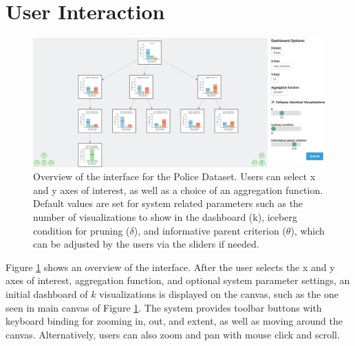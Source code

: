 \section{User Interaction\label{sec:interaction}}
\begin{figure}[ht!]
\centering
\includegraphics[width=\linewidth]{figures/overview.jpeg}
\caption{Overview of the \system interface for the Police Dataset. Users can select x and y axes of interest, as well as a choice of an aggregation function. Default values are set for system related parameters such as the number of visualizations to show in the dashboard (k), iceberg condition for pruning ($\delta$), and informative parent criterion ($\theta$), which can be adjusted by the users via the sliders if needed.}
\label{fig:overview}
\end{figure}
\par Figure \ref{fig:overview} shows an overview of the \system interface. After the user selects the x and y axes of interest, aggregation function, and optional system parameter settings, an initial dashboard of $k$ visualizations is displayed on the canvas, such as the one seen in main canvas of Figure \ref{fig:overview}. The system provides toolbar buttons with keyboard binding for zooming in, out, and extent, as well as moving around the canvas. Alternatively, users can also zoom and pan with mouse click and scroll.
